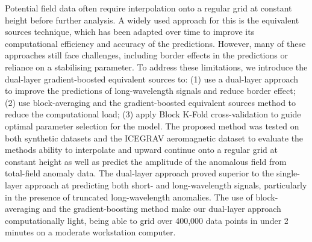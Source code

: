 Potential field data often require interpolation onto a regular grid at constant height before further analysis. A widely used approach for this is the equivalent sources technique, which has been adapted over time to improve its computational efficiency and accuracy of the predictions. However, many of these approaches still face challenges, including border effects in the predictions or reliance on a stabilising parameter. To address these limitations, we introduce the dual-layer gradient-boosted equivalent sources to: (1) use a dual-layer approach to improve the predictions of long-wavelength signals and reduce border effect; (2) use block-averaging and the gradient-boosted equivalent sources method to reduce the computational load; (3) apply Block K-Fold cross-validation to guide optimal parameter selection for the model. The proposed method was tested on both synthetic datasets and the ICEGRAV aeromagnetic dataset to evaluate the methods ability to interpolate and upward continue onto a regular grid at constant height as well as predict the amplitude of the anomalous field from total-field anomaly data. The dual-layer approach proved superior to the single-layer approach at predicting both short- and long-wavelength signals, particularly in the presence of truncated long-wavelength anomalies.
The use of block-averaging and the gradient-boosting method make our dual-layer approach computationally light, being able to grid over 400,000 data points in under 2 minutes on a moderate workstation computer.